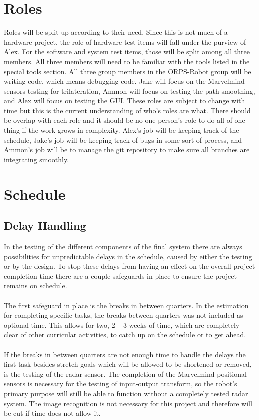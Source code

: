 \documentclass[english,12pt]{article}
\begin{document}
\section{Roles}
Roles will be split up according to their need. Since this is not much of a hardware project, 
the role of hardware test items will fall under the purview of Alex. For the software and 
system test items, those will be split among all three members. All three members will need to 
be familiar with the tools listed in the special tools section. All three group members in the 
ORPS-Robot group will be writing code, which means debugging code. Jake will focus on the 
Marvelmind sensors testing for trilateration, Ammon will focus on testing the path smoothing, 
and Alex will focus on testing the GUI. These roles are subject to change with time but this is 
the current understanding of who's roles are what. There should be overlap with each role and 
it should be no one person's role to do all of one thing if the work grows in complexity. Alex's 
job will be keeping track of the schedule, Jake's job will be keeping track of bugs in some sort of 
process, and Ammon's job will be to manage the git repository to make sure all branches are integrating 
smoothly.
\section{Schedule}
\subsection{Delay Handling}
In the testing of the different components of the final system there are always possibilities 
for unpredictable delays in the schedule, caused by either the testing or by the design. 
To stop these delays from having an effect on the overall project completion time there are a 
couple safeguards in place to ensure the project remains on schedule.\\\\
The first safeguard in place is the breaks in between quarters. In the estimation for 
completing specific tasks, the breaks between quarters was not included as optional time. 
This allows for two, 2 – 3 weeks of time, which are completely clear of other curricular 
activities, to catch up on the schedule or to get ahead.\\\\
If the breaks in between quarters are not enough time to handle the delays the first task 
besides stretch goals which will be allowed to be shortened or removed, is the testing of 
the radar sensor. The completion of the Marvelmind positional sensors is necessary for the 
testing of input-output transform, so the robot’s primary purpose will still be able to 
function without a completely tested radar system. The image recognition is not necessary for this project 
and therefore will be cut if time does not allow it.
\end{document}
